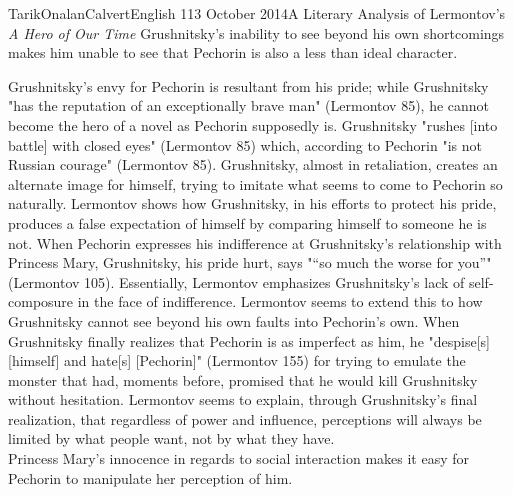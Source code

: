 \documentclass[12pt,a4paper]{article}
\begin{document}
\begin{mla}{Tarik}{Onalan}{Calvert}{English 1}{13 October 2014}{A Literary Analysis of Lermontov's \textit{A Hero of Our Time}}
        Grushnitsky's inability to see beyond his own shortcomings makes him unable
        to see that Pechorin is also a less than ideal character.

        Grushnitsky's envy for Pechorin is resultant from his pride; while Grushnitsky
        "has the reputation of an exceptionally brave man" (Lermontov 85), he cannot
        become the hero of a novel as Pechorin supposedly is. Grushnitsky
        "rushes [into battle] with closed eyes" (Lermontov 85) which, according to Pechorin
        "is not Russian courage" (Lermontov 85). Grushnitsky, almost in retaliation, creates
        an alternate image for himself, trying to imitate what seems to come to Pechorin so
        naturally. Lermontov shows how Grushnitsky, in his efforts to protect his pride,
        produces a false expectation of himself by comparing himself to someone he is not.
        When Pechorin expresses his indifference at Grushnitsky's relationship with
        Princess Mary, Grushnitsky, his pride hurt, says "\enquote{so much the worse
        for you}" (Lermontov 105). Essentially, Lermontov emphasizes Grushnitsky's lack
        of self-composure in the face of indifference. Lermontov seems to extend this
        to how Grushnitsky cannot see beyond his own faults into Pechorin's own. When
        Grushnitsky finally realizes that Pechorin is as imperfect as him, he "despise[s]
        [himself] and hate[s] [Pechorin]" (Lermontov 155) for trying to emulate the monster
        that had, moments before, promised that he would kill Grushnitsky without hesitation.
        Lermontov seems to explain, through Grushnitsky's final realization, that
        regardless of power and influence, perceptions will always be limited by what
        people want, not by what they have.\\

        Princess Mary's innocence in regards to social interaction makes it easy for
        Pechorin to manipulate her perception of him.


\end{mla}
\end{document}
